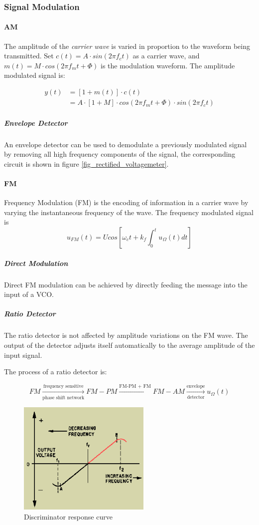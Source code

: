 \subsubsection{Signal Modulation}

\paragraph{AM} The amplitude of the \emph{carrier wave} is varied in proportion to the waveform being transmitted. Set $c(t)=A\cdot sin(2\pi f_c t)$ as a carrier wave, and $m(t) = M \cdot cos(2 \pi f_m t + \Phi)$ is the modulation waveform. The amplitude modulated signal is:

\begin{align*}
  y(t) &= [ 1+ m(t)] \cdot c(t) \\
       &= A \cdot [ 1 + M ] \cdot cos(2 \pi f_m t + \Phi ) \cdot sin(2 \pi f_c t )
\end{align*}

\subparagraph{Envelope Detector} An envelope detector can be used to demodulate a previously modulated signal by removing all high frequency components of the signal, the corresponding circuit is shown in figure \ref{fig_rectified_voltagemeter}.

\paragraph{FM} Frequency Modulation (FM) is the encoding of information in a carrier wave by varying the instantaneous frequency of the wave. The frequency modulated signal is
$$u_{FM}(t)=Ucos[\omega_c t + k_f \int_{0}^{t} u_\Omega (t) dt]$$

\subparagraph{Direct Modulation} Direct FM modulation can be achieved by directly feeding the message into the input of a VCO.

\subparagraph{Ratio Detector} The ratio detector is not affected by amplitude variations on the FM wave. The output of the detector adjusts itself automatically to the average amplitude of the input signal.

The process of a ratio detector is:

$$FM\xrightarrow[\text{phase shift network}]{\text{frequency sensitive}}FM-PM\xrightarrow[]{\text{FM-PM + FM}}FM-AM\xrightarrow[\text{detector}]{\text{envelope}}u_\Omega(t)$$

\begin{figure}
  \centering
  \includegraphics[width=2.5in]{fig/0260.png}
  \caption{Discriminator response curve}\label{fig_discriminator_respc}
\end{figure}

